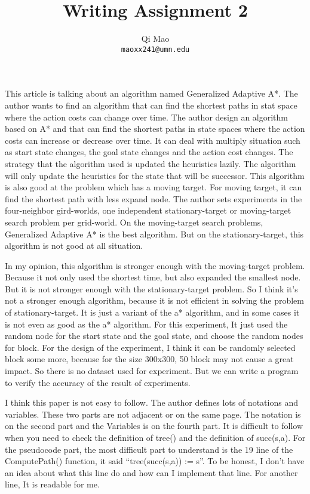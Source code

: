 \documentclass{article}
\begin{document}
\title{Writing Assignment 2}
\author{Qi Mao\\
  \texttt{maoxx241@umn.edu}}
\maketitle


This article is talking about an algorithm named Generalized Adaptive A*. 
The author wants to find an algorithm that can find the shortest paths in stat space where the action costs can change over time. 
The author design an algorithm based on A* and that can find the shortest paths in state spaces where the action costs can 
increase or decrease over time. It can deal with multiply situation such as start 
state changes, the goal state changes and the action cost changes. 
The strategy that the algorithm used is updated the heuristics lazily. 
The algorithm will only update the heuristics for the state that will be successor. 
This algorithm is also good at the problem which has a moving target. For moving target, 
it can find the shortest path with less expand node. The author sets experiments in the 
four-neighbor gird-worlds, one independent stationary-target or moving-target search 
problem per grid-world. On the moving-target search problems, 
Generalized Adaptive A* is the best algorithm. 
But on the stationary-target, this algorithm is not good at all situation. 

In my opinion, 
this algorithm is stronger enough with the moving-target problem. 
Because it not only used the shortest time, 
but also expanded the smallest node. 
But it is not stronger enough with the stationary-target problem.
So I think it's not a stronger enough algorithm, 
because it is not efficient in solving the problem of stationary-target.
It is just a variant of the a* algorithm, 
and in some cases it is not even as good as the a* algorithm.
For this experiment, 
It just used the random node for the start state and the goal state, 
and  choose the random nodes for block. 
For the design of the experiment, 
I think it can be randomly selected block some more, 
because for the size 300x300, 50 block may not cause a great impact.
So there is no dataset used for experiment. 
But we can write a program to verify the accuracy of the result of experiments. 

I think this paper is not easy to follow. 
The author defines lots of notations and variables. 
These two parts are not adjacent or on the same page. 
The notation is on the second part and the Variables is on the fourth part. 
It is difficult to follow when you need to check the definition of tree() 
and the definition of succ(s,a). For the pseudocode part, 
the most difficult part to understand is the 19 line of the ComputePath() function, 
it said “tree(succ(s,a)) := s”. To be honest, 
I don’t have an idea about what this line do and how can I implement that line. 
For another line, It is readable for me. 
\end{document}
